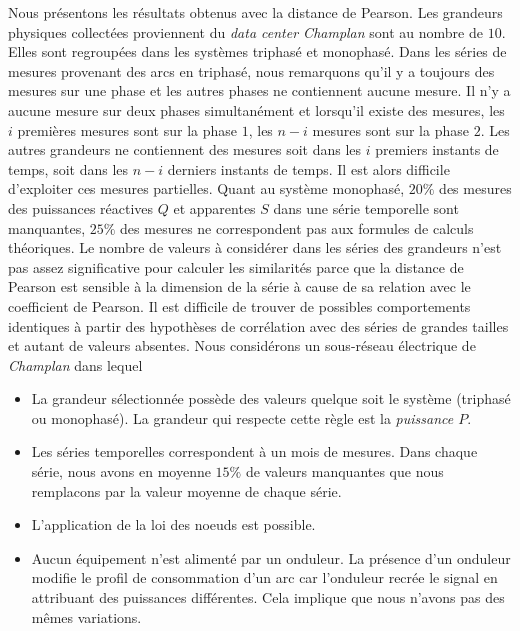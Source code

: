 Nous pr\'esentons les r\'esultats obtenus avec la distance de Pearson.
\newline
Les grandeurs physiques collect\'ees proviennent du {\em data center Champlan} sont au nombre de $10$. Elles sont regroup\'ees dans les syst\`emes triphas\'e et monophas\'e.
Dans les s\'eries de mesures  provenant des arcs en triphas\'e, nous remarquons qu'il y a toujours des mesures sur une phase et les autres phases ne contiennent aucune mesure. Il n'y a aucune mesure sur deux phases simultan\'ement et lorsqu'il  existe des mesures, les $i$ premi\`eres mesures sont sur la phase $1$, les $n-i$ mesures sont sur la phase $2$. 
Les autres grandeurs ne contiennent des mesures 
soit dans les $i$ premiers instants de temps, 
soit dans les $n-i$ derniers instants de temps. 
Il est alors difficile d'exploiter ces mesures partielles.
Quant au syst\`eme monophas\'e, $20\%$ des mesures des puissances r\'eactives $Q$ et apparentes $S$ dans une s\'erie temporelle sont manquantes, $25\%$ des mesures ne correspondent pas aux formules de calculs th\'eoriques. 
Le nombre de valeurs \`a consid\'erer dans les s\'eries des grandeurs n'est pas assez significative pour calculer les similarit\'es parce que la distance de Pearson est sensible \`a la dimension de la s\'erie \`a cause de sa relation avec le coefficient de Pearson. Il est difficile de trouver de possibles comportements identiques \`a partir des hypoth\`eses de corr\'elation avec des s\'eries de grandes tailles et autant de valeurs absentes.
\newline
Nous consid\'erons un sous-r\'eseau \'electrique de {\em Champlan} dans lequel 
\begin{itemize}
	\item La grandeur s\'electionn\'ee poss\`ede des valeurs quelque soit le syst\`eme (triphas\'e ou monophas\'e). La grandeur qui respecte cette r\`egle est la {\em puissance $P$}.
	\item Les s\'eries temporelles correspondent \`a un mois de mesures. 
		Dans chaque s\'erie, nous avons en moyenne $15\%$ de valeurs manquantes que nous remplacons par la valeur moyenne de chaque s\'erie.
	\item L'application de la loi des noeuds est possible.
	\item Aucun \'equipement n'est aliment\'e par un onduleur. La pr\'esence d'un onduleur modifie le profil de consommation d'un arc car l'onduleur recr\'ee le signal en attribuant des puissances diff\'erentes. Cela implique que nous n'avons pas des m\^emes variations.
	 
\end{itemize}
